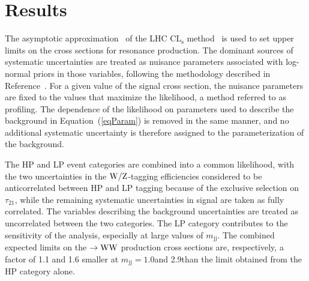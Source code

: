 \newpage
\section{Results}
\label{sec:results1}


The asymptotic approximation~\cite{AsymptCLs} of the LHC
$\mathrm{CL_s}$ method~\cite{CLs1,CLs3} is used to set upper limits on
the cross sections for resonance production. The dominant sources of
systematic uncertainties are treated as nuisance parameters associated
with log-normal priors in those variables, following the methodology
described in Reference~\cite{ATLASCMSstat}. For a given value of the
signal cross section, the nuisance parameters are fixed to the values
that maximize the likelihood, a method referred to as
profiling. The dependence of the likelihood on parameters used to
describe the background in Equation~(\ref{eqParam}) is removed in the same
manner, and no additional systematic uncertainty is therefore assigned
to the parameterization of the background.

The HP and LP event categories are combined into a common likelihood,
with the two uncertainties in the ${\rm W}/{\rm Z}$-tagging efficiencies
considered to be anticorrelated between HP and LP tagging because of
the exclusive selection on $\tau_{21}$, while the remaining systematic
uncertainties in signal are taken as fully correlated. The variables
describing the background uncertainties are treated as uncorrelated
between the two categories. The LP category contributes to the
sensitivity of the analysis, especially at large values of
$m_\mathrm{jj}$. The combined expected limits on the \GRS $\to{\rm W}{\rm W}$
production cross sections are, respectively, a factor of 1.1 and 1.6
smaller at $m_\mathrm{jj}=1.0$\TeVcc and 2.9\TeVcc than the limit
obtained from the HP category alone.


